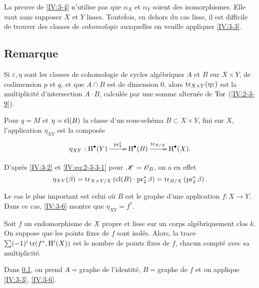 La preuve de \ref{IV:3-4} n'utilise pas que $\alpha_X$ et $\alpha_Y$ soient des 
isomorphismes. Elle vaut sans supposer $X$ et $Y$ lisses. Toutefois, en dehors 
du cas lisse, il est difficile de trouver des classes de \emph{cohomologie} 
auxquelles on veuille appliquer \ref{IV:3-3}. 





\subsection{Remarque}\label{IV:3-5}

Si $\varepsilon,\eta$ sont les classes de cohomologie de cycles alg\'ebriques 
$A$ et $B$ sur $X\times Y$, de codimension $p$ et $q$, et que $A\cap B$ est de 
dimension $0$, alors $\operatorname{tr}_{X\times Y}(\eta\varepsilon)$ est la multiplicit\'e 
d'intersection $A\cdot B$, calcul\'ee par une somme altern\'ee de $\operatorname{Tor}$ 
(\ref{IV:2-3-9}). 





\begin{proposition_}\label{IV:3-6}
Pour $q=M$ et $\eta=\operatorname{cl}(B)$ la classe d'un sous-sch\'ema $B\subset X\times Y$, 
fini sur $X$, l'application $\eta_{X Y}$ est la compos\'ee 
\[\xymatrix{
  \eta_{X Y} : \h^\bullet(Y) \ar[r]^-{\operatorname{pr}_2^\ast} 
    & \h^\bullet(B) \ar[r]^-{\tr_{B/X}} 
    & \h^\bullet(X) \text{.}
}\]
\end{proposition_}

D'apr\`es \ref{IV:3-2} et \eqref{IV:eq:2-3-3-1} pour $\mathscr{K}=\mathscr{O}_B$, on a en 
effet 
\[
  \eta_{X Y}(\beta) = \operatorname{tr}_{X\times Y/X}\left(\operatorname{cl}(B)\cdot \operatorname{pr}_2^\ast\beta\right) = \operatorname{tr}_{B/X}\left(\operatorname{pr}_2^\ast \beta\right) \text{.}
\]

Le cas le plus important est celui o\`u $B$ est le graphe d'une application 
$f:X\to Y$. Dans ce cas, \ref{IV:3-6} montre que $\eta_{X Y}=f^\ast$. 





\begin{corollary_}\label{IV:3-7}
Soit $f$ un endomorphisme de $X$ propre et lisse sur un corps alg\'ebriquement 
clos $k$. On suppose que les points fixes de $f$ sont isol\'es. Alors, la 
trace $\sum (-1)^i \operatorname{tr}(f^\ast,\operatorname{H}^i(X))$ est le nombre de points fixes de $f$, 
chacun compt\'e avec sa multiplicit\'e.
\end{corollary_}

Dans \ref{IV:3-5}, on prend $A=$graphe de l'identit\'e, $B=$graphe de $f$ et on 
applique \ref{IV:3-3}, \ref{IV:3-6}. 





